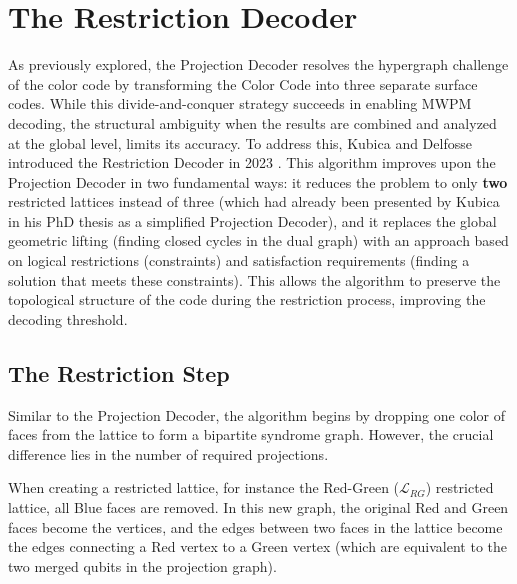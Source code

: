 \section{The Restriction Decoder}
\label{sec:restriction_decoder}

 As previously explored, the Projection Decoder resolves the hypergraph challenge of the color code by transforming the Color Code into three separate surface codes. While this divide-and-conquer strategy succeeds in enabling MWPM decoding, the structural ambiguity when the results are combined and analyzed at the global level, limits its accuracy. To address this, Kubica and Delfosse introduced the Restriction Decoder in 2023 \cite{Kubica_2023}. This algorithm improves upon the Projection Decoder in two fundamental ways: it reduces the problem to only \textbf{two} restricted lattices instead of three (which had already been presented by Kubica in his PhD thesis \cite{Kubica_2018} as a simplified Projection Decoder), and it replaces the global geometric lifting (finding closed cycles in the dual graph) with an approach based on logical restrictions (constraints) and satisfaction requirements (finding a solution that meets these constraints). This allows the algorithm to preserve the topological structure of the code during the restriction process, improving the decoding threshold.

\subsection{The Restriction Step}
Similar to the Projection Decoder, the algorithm begins by dropping one color of faces from the lattice to form a bipartite syndrome graph. However, the crucial difference lies in the number of required projections. 

 When creating a restricted lattice, for instance the Red-Green ($\mathcal{L}_{RG}$) restricted lattice, all Blue faces are removed. In this new graph, the original Red and Green faces become the vertices, and the edges between two faces in the lattice become the edges connecting a Red vertex to a Green vertex (which are equivalent to the two merged qubits in the projection graph). 

